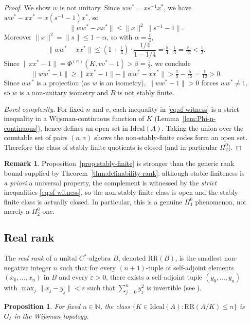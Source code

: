 \documentclass[12pt,fleqn,a4paper]{amsart}
\renewcommand{\le}{\leqslant}
\renewcommand{\ge}{\geqslant}
\numberwithin{equation}{section}
\newtheorem{proposition}[theorem]{Proposition}
\theoremstyle{definition}
\newtheorem{remark}[theorem]{Remark}
\newcommand{\N}{\mathbb{N}}
\newcommand{\Ideal}{\mathrm{Ideal}}
\begin{document}
\begin{proof}
We show $w$ is not unitary. Since $ww^*=xs^{-1}x^*$, we have
$ww^*-xx^*=x(s^{-1}-1)x^*$, so
\[
\|ww^*-xx^*\|\le \|x\|^2\,\|s^{-1}-1\|.
\]
Moreover $\|x\|^2=\|s\|\le 1+\alpha$, so with $\alpha=\tfrac14$,
\[
\|ww^*-xx^*\|\le (1+\tfrac14)\cdot\frac{1/4}{1-1/4}
= \tfrac54\cdot\tfrac13=\tfrac{5}{12}<\tfrac12.
\]
Since $\|xx^*-1\|=\Phi^{(n)}(K,vv^*-1)>\beta=\tfrac12$, we conclude
\[
\|ww^*-1\|
\ge \|xx^*-1\|-\|ww^*-xx^*\|
> \tfrac12-\tfrac{5}{12}=\tfrac{1}{12}>0.
\]
Since $ww^*$ is a projection (as $w$ is an isometry), $\|ww^*-1\|>0$ forces
$ww^*\neq 1$, so $w$ is a non-unitary isometry and $B$ is not stably finite.

\smallskip\noindent
\emph{Borel complexity.}
For fixed $n$ and $v$, each inequality in \eqref{eq:sf-witness} is a strict
inequality in a Wijsman-continuous function of $K$ (Lemma~\ref{lem:Phi-n-continuous}),
hence defines an open set in $\Ideal(A)$. Taking the union over the countable set of
pairs $(n,v)$ shows the non-stably-finite codes form an open set. Therefore the class
of stably finite quotients is closed (and in particular $\Pi^0_2$).
\end{proof}

\begin{remark}\label{rem:stably-finite-sharp}
Proposition~\ref{prop:stably-finite} is stronger than the generic rank bound supplied by
Theorem~\ref{thm:definability-rank}: although stable finiteness is \emph{a priori} a universal
property, the complement is witnessed by the \emph{strict} inequalities
\eqref{eq:sf-witness}, so the non-stably-finite class is open and the stably finite class is
actually closed.  In particular, this is a genuine $\Pi^0_1$ phenomenon, not merely a
$\Pi^0_2$ one.
\end{remark}

\subsection{Real rank}

The \emph{real rank} of a unital $C^*$-algebra $B$, denoted $\mathrm{RR}(B)$, is the
smallest non-negative integer $n$ such that for every $(n\!+\!1)$-tuple of self-adjoint
elements $(x_0,\dots,x_n)$ in $B$ and every $\varepsilon>0$, there exists a
self-adjoint tuple $(y_0,\dots,y_n)$ with $\max_j\|x_j-y_j\|<\varepsilon$ such that
$\sum_{j=0}^n y_j^2$ is invertible (see \cite[V.3.2.3]{BlackadarOA}).

\begin{proposition}\label{prop:real-rank}
For fixed $n\in\N$, the class
$\{K\in\Ideal(A):\mathrm{RR}(A/K)\le n\}$ is $G_\delta$ in the Wijsman topology.
\end{proposition}
\end{document}
